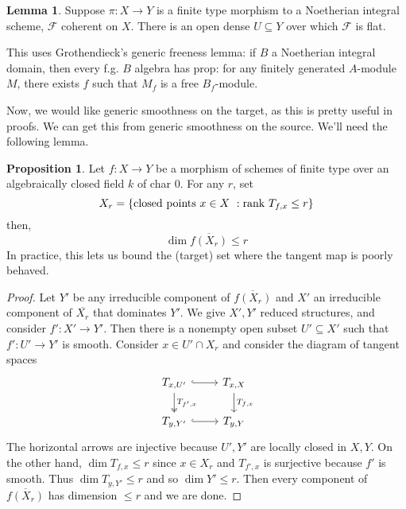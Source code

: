 \documentclass[10pt,reqno]{amsart}
\theoremstyle{definition}
\newtheorem{proposition}[theorem]{Proposition}
\newtheorem{lemma}[theorem]{Lemma}
\theoremstyle{remark}
\numberwithin{equation}{section}
\numberwithin{theorem}{section}
\newcommand{\FF}{{\mathscr F}}
\begin{document}
\begin{lemma} Suppose $\pi: X \to Y$ is a finite type morphism to a Noetherian integral scheme, $\FF$ coherent on $X$. There is an open dense $U \subseteq Y$ over which $\FF$ is flat. 
\end{lemma}

This uses Grothendieck's generic freeness lemma: if $B$ a Noetherian integral domain, then every f.g. $B$ algebra has prop: for any finitely generated $A$-module $M$, there exists $f$ such that $M_f$ is a free $B_f$-module.

Now, we would like generic smoothness on the target, as this is pretty useful in proofs. We can get this from generic smoothness on the source. We'll need the following lemma.

\begin{proposition}\label{prop:tangent-rank-contained} Let $f: X \to Y$ be a morphism of schemes of finite type over an algebraically closed field $k$ of char $0$. For any $r$, set 
\[X_r = \{\textup{closed points $x \in X$ }: \textup{rank } T_{f,x} \le r\}\]
then,
\[\dim \overline{f(X_r)} \le r\]
In practice, this lets us bound the (target) set where the tangent map is poorly behaved.
\end{proposition}
\begin{proof}
Let $Y'$ be any irreducible component of $\overline{f(X_r)}$ and $X'$ an irreducible component of $\overline{X_r}$ that dominates $Y'$. We give $X', Y'$ reduced structures, and consider $f': X' \to Y'$. Then there is a nonempty open subset $U' \subseteq X'$ such that $f': U' \to Y'$ is smooth. Consider $x \in U' \cap X_r$ and consider the diagram of tangent spaces
\[
\begin{tikzcd}
T_{x,U'} \arrow[d, twoheadrightarrow, "T_{f',x}"] \arrow[r, hook]&T_{x,X} \arrow[d, "T_{f,x}"]\\
T_{y,Y'} \arrow[r, hook] &T_{y,Y}
\end{tikzcd}
\]
The horizontal arrows are injective because $U',Y'$ are locally closed in $X,Y$. On the other hand, $\dim T_{f,x} \le r$ since $x \in X_r$ and $T_{f',x}$ is surjective because $f'$ is smooth. Thus $\dim T_{y,Y'} \le r$ and so $\dim Y' \le r$. Then every component of $\overline{f(X_r)}$ has dimension $\le r$ and we are done. 
\end{proof}
\end{document}

